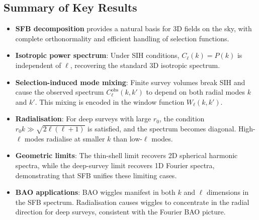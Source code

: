 \subsection{Summary of Key Results}

\begin{itemize}

\item \textbf{SFB decomposition} provides a natural basis for 3D fields on the sky, with complete orthonormality
and efficient handling of selection functions.

\item \textbf{Isotropic power spectrum}: Under SIH conditions, $C_\ell(k)=P(k)$ is independent of $\ell$, recovering
the standard 3D isotropic spectrum.

\item \textbf{Selection-induced mode mixing}: Finite survey volumes break SIH and cause the observed spectrum
$C^{\text{obs}}_\ell(k,k')$ to depend on both radial modes $k$ and $k'$. This mixing is encoded in the window function
$W_\ell(k,k')$.

\item \textbf{Radialisation}: For deep surveys with large $r_0$, the condition $r_0 k \gg \sqrt{2\ell(\ell+1)}$ is
satisfied, and the spectrum becomes diagonal. High-$\ell$ modes radialise at smaller $k$ than low-$\ell$ modes.

\item \textbf{Geometric limits}: The thin-shell limit recovers 2D spherical harmonic spectra, while the deep-survey
limit recovers 1D Fourier spectra, demonstrating that SFB unifies these limiting cases.

\item \textbf{BAO applications}: BAO wiggles manifest in both $k$ and $\ell$ dimensions in the SFB spectrum. Radialisation
causes wiggles to concentrate in the radial direction for deep surveys, consistent with the Fourier BAO picture.

\end{itemize}
